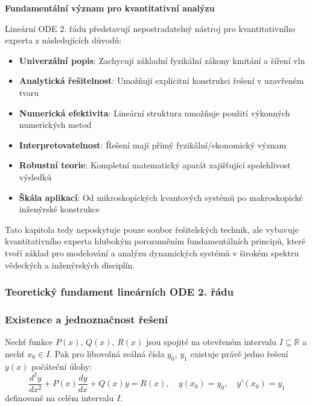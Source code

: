 \vspace{1\baselineskip}

\noindent\textbf{Fundamentální význam pro kvantitativní analýzu}

Lineární ODE 2. řádu představují nepostradatelný nástroj pro kvantitativního experta z následujících důvodů:

\begin{itemize}
\item \textbf{Univerzální popis}: Zachycují základní fyzikální zákony kmitání a šíření vln

\item \textbf{Analytická řešitelnost}: Umožňují explicitní konstrukci řešení v uzavřeném tvaru

\item \textbf{Numerická efektivita}: Lineární struktura umožňuje použití výkonných numerických metod

\item \textbf{Interpretovatelnost}: Řešení mají přímý fyzikální/ekonomický význam

\item \textbf{Robustní teorie}: Kompletní matematický aparát zajišťující spolehlivost výsledků

\item \textbf{Škála aplikací}: Od mikroskopických kvantových systémů po makroskopické inženýrské konstrukce
\end{itemize}

\vspace{1\baselineskip}

Tato kapitola tedy neposkytuje pouze soubor řešitelských technik, ale vybavuje kvantitativního experta hlubokým porozuměním fundamentálních principů, které tvoří základ pro modelování a analýzu dynamických systémů v širokém spektru vědeckých a inženýrských disciplín.

\subsubsection{Teoretický fundament lineárních ODE 2. řádu}
\label{subsec:teoreticky-fundament-2rad}

\subsubsection{Existence a jednoznačnost řešení}
\label{subsubsec:existence-jednoznacnost}

\begin{theorem}
Nechť funkce $P(x)$, $Q(x)$, $R(x)$ jsou spojité na otevřeném intervalu $I \subseteq \mathbb{R}$ a nechť $x_0 \in I$. Pak pro libovolná reálná čísla $y_0$, $y_1$ existuje právě jedno řešení $y(x)$ počáteční úlohy:
\[
\frac{d^2y}{dx^2} + P(x)\frac{dy}{dx} + Q(x)y = R(x), \quad y(x_0) = y_0, \quad y'(x_0) = y_1
\]
definované na celém intervalu $I$.
\end{theorem}


